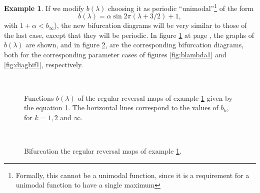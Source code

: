 \documentclass[10pt,twoside,titlepage]{book}
\numberwithin{equation}{chapter}
\numberwithin{figure}{chapter}
\numberwithin{table}{chapter}
\theoremstyle{plain}%
\theoremstyle{definition}
\newtheorem{example}{Example}[chapter]
\theoremstyle{remark}
\begin{document}
\begin{example}
	\label{ex:quadratic1b}
	If we modify $b(\lambda)$ choosing it as periodic ``unimodal''\footnote{Formally, this cannot be a unimodal function, since it is a requirement for a unimodal function to have a single maximum} of the form
	\begin{equation}
		b(\lambda)=\alpha\sin{2\pi(\lambda+3/2)}+1,
		\label{eq:quadratic1b}
	\end{equation}
	with $1+\alpha<b_{\infty}$), the new bifurcation diagrams will be very similar to those of the last case, except that they will be periodic. In figure \ref{fig:blambda1b} at page \pageref{fig:blambda1b}, the graphs of $b(\lambda)$ are shown, and in figure \ref{fig:diagbif1b}, are the corresponding bifurcation diagrams, both for the corresponding parameter cases of figures \ref{fig:blambda1} and \ref{fig:diagbif1}, respectively.
	
	\begin{figure}
		\centering
		\\
		\caption{Functions $b(\lambda)$ of the regular reversal maps of example \ref{ex:quadratic1b} given by the equation \ref{ex:quadratic1b}. The horizontal lines correspond to the values of $b_{k}$, for $k=1,2$ and $\infty$.}
		\label{fig:blambda1b}
	\end{figure}
	
	\begin{figure}
		\centering
		\\
		\caption{Bifurcation the regular reversal maps of example \ref{ex:quadratic1b}.}
		\label{fig:diagbif1b}
	\end{figure}
	
\end{example}
\end{document}
